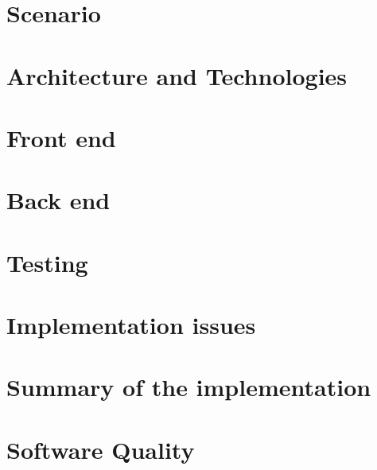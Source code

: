 \section{Scenario}
\section{Architecture and Technologies}
\section{Front end}
\section{Back end}	
\section{Testing}
\section{Implementation issues}
\section{Summary of the implementation}
\section{Software Quality}






